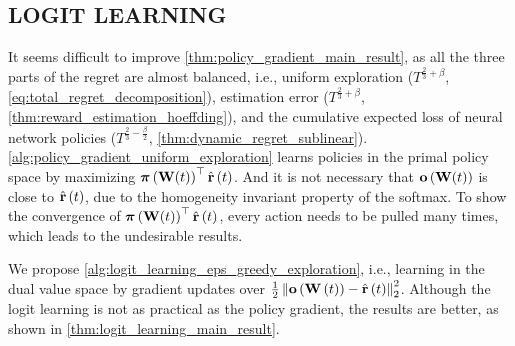 \subsection{LOGIT LEARNING}
\label{subsec:theoretical_analyses_logit_learning}

It seems difficult to improve \cref{thm:policy_gradient_main_result}, as all the three parts of the regret are almost balanced, i.e., uniform exploration ($ T^{\frac{2}{3} + \beta}$, \cref{eq:total_regret_decomposition}), estimation error ($ T^{\frac{2}{3} + \beta} $, \cref{thm:reward_estimation_hoeffding}), and the cumulative expected loss of neural network policies ($ T^{\frac{2}{3} - \frac{\beta}{2}} $, \cref{thm:dynamic_regret_sublinear}). \cref{alg:policy_gradient_uniform_exploration} learns policies in the primal policy space by maximizing ${\boldsymbol{\pi}}\left( {\mathbf{W}}(t) \right)^\top \hat{{\mathbf{r}}}\left(t\right)$. And it is not necessary that ${\mathbf{o}}\left( {\mathbf{W}}(t)\right)$ is close to $\hat{{\mathbf{r}}}\left(t\right)$, due to the homogeneity invariant property of the softmax. To show the convergence of ${\boldsymbol{\pi}}\left( {\mathbf{W}}(t) \right)^\top \hat{{\mathbf{r}}}\left(t\right)$, every action needs to be pulled many times, which leads to the undesirable results.

We propose \cref{alg:logit_learning_eps_greedy_exploration}, i.e., learning in the dual value space by gradient updates over $\frac{1}{2} \left\| {\mathbf{o}}\left( {\mathbf{W}}\left(t\right)\right) - \hat{{\mathbf{r}}}\left(t\right) \right\|_2^2$. Although the logit learning is not as practical as the policy gradient, the results are better, as shown in \cref{thm:logit_learning_main_result}.

